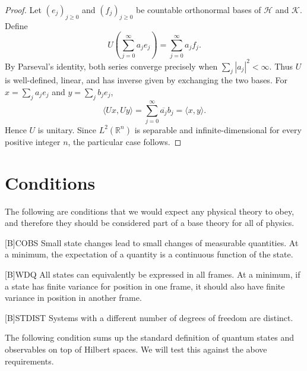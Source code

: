 \documentclass{techbrief}
\begin{document}
\begin{proof}
	Let $(e_j)_{j\geq0}$ and $(f_j)_{j\geq0}$ be countable
	orthonormal bases of $\mathcal{H}$ and $\mathcal{K}$.
	Define
	\begin{equation*}
		U\left(\sum_{j=0}^{\infty}a_je_j\right)
		=\sum_{j=0}^{\infty}a_jf_j.
	\end{equation*}
	By Parseval's identity, both series converge precisely when
	$\sum_j|a_j|^2<\infty$. Thus $U$ is well-defined, linear,
	and has inverse given by exchanging the two bases.
	For $x=\sum_j a_je_j$ and $y=\sum_j b_je_j$,
	\begin{equation*}
		\langle Ux,Uy\rangle
		=\sum_{j=0}^{\infty}\overline{a_j}b_j
		=\langle x,y\rangle.
	\end{equation*}
	Hence $U$ is unitary. Since $L^2(\mathbb{R}^n)$ is
	separable and infinite-dimensional for every positive
	integer $n$, the particular case follows.
\end{proof}

\section{Conditions}

The following are conditions that we would expect any physical theory to obey, and therefore they should be considered part of a base theory for all of physics.

\begin{condition}{[B]COBS}
	Small state changes lead to small changes of measurable quantities. At a minimum, the expectation of a quantity is a continuous function of the state.
\end{condition}

\begin{condition}{[B]WDQ}
	All states can equivalently be expressed in all frames. At a minimum, if a state has finite variance for position in one frame, it should also have finite variance in position in another frame.
\end{condition}

\begin{condition}{[B]STDIST}
	Systems with a different number of degrees of freedom are distinct.
\end{condition}

The following condition sums up the standard definition of quantum states and observables on top of Hilbert spaces. We will test this against the above requirements.
\end{document}
